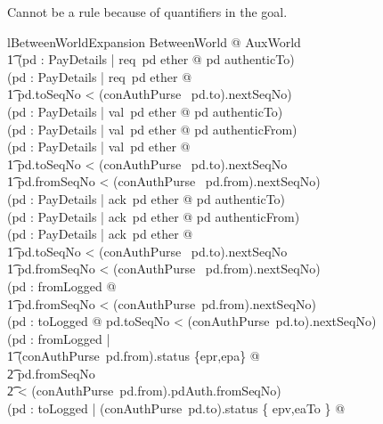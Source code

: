 Cannot be a rule because of quantifiers in the goal.
%
\begin{LNewLemma}
\begin{zeves-theorem}{lBetweenWorldExpansion}
    \forall BetweenWorld @
    AuxWorld \land \\ \t1
    (\forall pd : PayDetails | req~pd \in ether @ pd \in authenticTo) \\
    \land
    (\forall pd : PayDetails | req~pd \in ether @ \\
        \t1 pd.toSeqNo < (conAuthPurse~ pd.to).nextSeqNo) \\
    \land
    (\forall pd : PayDetails | val~pd \in ether @ pd \in authenticTo) \\
    \land
    (\forall pd : PayDetails | val~pd \in ether @ pd \in authenticFrom) \\
    \land
    (\forall pd : PayDetails | val~pd \in ether @ \\
        \t1 pd.toSeqNo < (conAuthPurse~ pd.to).nextSeqNo \\
        \t1 \land pd.fromSeqNo < (conAuthPurse~ pd.from).nextSeqNo) \\
    \land
    (\forall pd : PayDetails | ack~pd \in ether @ pd \in authenticTo) \\
    \land
    (\forall pd : PayDetails | ack~pd \in ether @ pd \in authenticFrom) \\
    \land
    (\forall pd : PayDetails | ack~pd \in ether @ \\
        \t1 pd.toSeqNo < (conAuthPurse~ pd.to).nextSeqNo  \\ %
        \t1 \land pd.fromSeqNo < (conAuthPurse~ pd.from).nextSeqNo) \\
    \land %
    (\forall pd : fromLogged @  \\ %
        \t1 pd.fromSeqNo < (conAuthPurse~pd.from).nextSeqNo) \\
    \land %
    (\forall pd : toLogged @ pd.toSeqNo < (conAuthPurse~pd.to).nextSeqNo) \\
    \land %
    (\forall pd : fromLogged | \\ %
        \t1 (conAuthPurse~pd.from).status \in \{epr,epa\} @  \\ %
        \t2 pd.fromSeqNo \\ %
        \t2 < (conAuthPurse~pd.from).pdAuth.fromSeqNo) \\
    \land %
    (\forall pd : toLogged | (conAuthPurse~pd.to).status \in \{ epv,eaTo \} @ \\ %

\end{zeves-theorem}
\end{LNewLemma}
